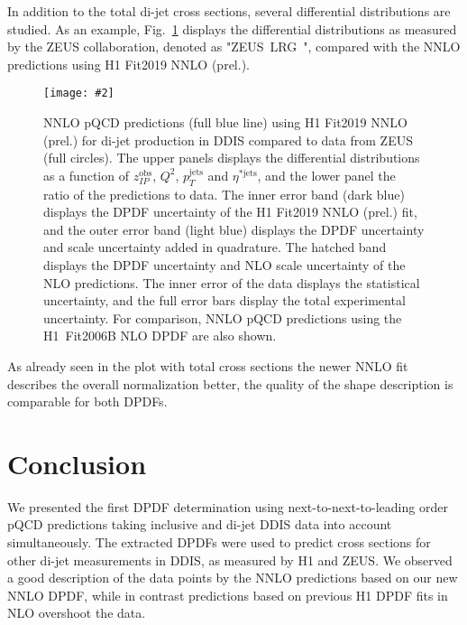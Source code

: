 \documentclass{PoS}
\makeatletter
\newcommand{\IP}{I\!\!P}
\newcommand{\includegraphicss}[2][]{\texttt{[image: \#2]}}
\newcommand*{\rom}[1]{\expandafter\@slowromancap\romannumeral #1@}
\newcommand{\HERAI} {\protect\scalebox{0.8}{(HERA~\rom{1})}}
\newcommand{\ZLRG}  {ZEUS~LRG~\HERAI\xspace}
\makeatother
\begin{document}
In addition to the total di-jet cross sections, several differential distributions are studied.
As an example, Fig.~\ref{figZEUSdiff} displays the differential distributions as measured by the ZEUS collaboration, denoted as "\ZLRG", compared with the NNLO predictions using H1 Fit2019 NNLO (prel.).
\begin{figure}[h]
\centering
\includegraphicss[trim={0cm 0.3cm 0 0.3cm},clip,width=.8\textwidth]{{{plots/H1prelim-19-013.fig7}}}
\caption{ NNLO pQCD predictions (full blue line) using H1 Fit2019 NNLO (prel.) for di-jet production in DDIS compared to data from ZEUS (full circles). The upper panels displays the differential distributions as a function of $z_{\IP}^\mathrm{obs}$, $Q^2$, $p_T^\mathrm{jets}$ and $\eta^{*\mathrm{jets}}$, and the lower panel the ratio of the predictions to data. The inner error band (dark blue) displays the DPDF uncertainty of the H1 Fit2019 NNLO (prel.) fit, and the outer error band (light blue) displays the DPDF uncertainty and scale uncertainty added in quadrature. The hatched band displays the DPDF uncertainty and NLO scale uncertainty of the NLO predictions. The inner error of the data displays the statistical uncertainty, and the full error bars display the total experimental uncertainty. For comparison, NNLO pQCD predictions using the H1~Fit2006B NLO DPDF are also shown.}
\label{figZEUSdiff}
\end{figure}
As already seen in the plot with total cross sections the newer NNLO fit describes the overall normalization better, the quality of the shape description is comparable for both DPDFs.

\section{Conclusion}
We presented the first DPDF determination using next-to-next-to-leading order pQCD predictions taking inclusive and di-jet DDIS data into account simultaneously.
The extracted DPDFs were used to predict cross sections for other di-jet measurements in DDIS, as measured by H1 and ZEUS.
We observed a good description of the data points by the NNLO predictions based on our new NNLO DPDF, while in contrast predictions based on previous H1 DPDF fits in NLO overshoot the data.




\end{document}
